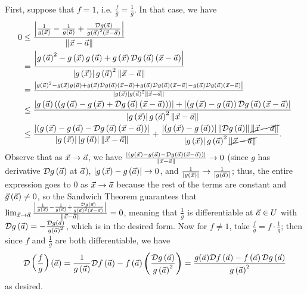 \documentclass[main.tex]{subfiles}
\begin{document}
\begin{soln}
    First, suppose that $f = 1$, i.e. $\frac{f}{g} = \frac{1}{g}$. In that case, we have
    \begin{align*}
        0&\le \frac{\abs{\frac{1}{g\parens{\vx}} - \frac{1}{g\parens{\va}} + \frac{\mathcal{D}g\parens{\va}}{g\parens{\va}^2\parens{\vx - \va}}}}{\norm{\vx - \va}} \\
        &=\frac{\abs{g\parens{\va}^2 - g\parens{\vx}g\parens{\va} + g\parens{\vx}\mathcal{D}g\parens{\va}\parens{\vx - \va}}}{\abs{g\parens{\vx}}g\parens{\va}^2\norm{\vx - \va}} \\
        &=\tfrac{\abs{g\parens{\va}^2 - g\parens{\vx}g\parens{\va} + g\parens{\vx}\mathcal{D}g\parens{\va}\parens{\vx - \va} + g\parens{\va}\mathcal{D}g\parens{\va}\parens{\vx - \va} - g\parens{\va}\mathcal{D}g\parens{\va}\parens{\vx - \va}}}{\abs{g\parens{\vx}}g\parens{\va}^2\norm{\vx - \va}} \\
        &\le\frac{\abs{g\parens{\va}\parens{\parens{g\parens{\va} - g\parens{\vx} + \mathcal{D}g\parens{\va}\parens{\vx - \va}}}} + \abs{\parens{g\parens{\vx} - g\parens{\va}}\mathcal{D}g\parens{\va}\parens{\vx - \va}}}{\abs{g\parens{\vx}}g\parens{\va}^2\norm{\vx - \va}} \\
        &\le \frac{\abs{\parens{g\parens{\vx} - g\parens{\va} - \mathcal{D}g\parens{\va}\parens{\vx - \va}}}}{\abs{g\parens{\vx}}\abs{g\parens{\va}}\norm{\vx - \va}} + \frac{\abs{\parens{g\parens{\vx} - g\parens{\va}}}\norm{\mathcal{D}g\parens{\va}}\cancel{\norm{\vx - \va}}}{\abs{g\parens{\vx}}g\parens{\va}^2\cancel{\norm{\vx - \va}}}.
    \end{align*}
    Observe that as $\vx\to\va$, we have $\frac{\abs{\parens{g\parens{\vx} - g\parens{\va} - \mathcal{D}g\parens{\va}\parens{\vx - \va}}}}{\norm{\vx - \va}}\to 0$ (since $g$ has derivative $\mathcal{D}g\parens{\va}$ at $\va$), $\abs{g\parens{\vx} - g\parens{\va}} \to 0$, and $\frac{1}{\abs{g\parens{\vx}}}\to \frac{1}{\abs{g\parens{\va}}}$; thus, the entire expression goes to $0$ as $\vx\to \va$ because the rest of the terms are constant and $\vg\parens{\va} \neq 0$, so the Sandwich Theorem guarantees that $\limv{a} \frac{\abs{\frac{1}{g\parens{\vx}} - \frac{1}{g\parens{\va}} + \frac{\mathcal{D}g\parens{\va}}{g\parens{\va}^2\parens{\vx - \va}}}}{\norm{\vx - \va}} = 0$, meaning that $\frac{1}{g}$ is differentiable at $\va\in U$ with $\mathcal{D}g\parens{\va} = -\frac{\mathcal{D}g\parens{\va}}{g\parens{\va}^2}$, which is in the desired form. Now for $f\neq 1$, take $\frac{f}{g} = f\cdot \frac{1}{g}$; then since $f$ and $\frac{1}{g}$ are both differentiable, we have
    \[\mathcal{D}\parens{\frac{f}{g}}\parens{\va} = \frac{1}{g\parens{\va}}\mathcal{D}f\parens{\va} - f\parens{\va}\parens{\frac{\mathcal{D}g\parens{\va}}{g\parens{\va}^2}} = \frac{g(\va)\mathcal{D}f\parens{\va} -f\parens{\va}\mathcal{D}g\parens{\va}}{g\parens{\va}^{2}}\]
    as desired.
\end{soln}
\eject
\end{document}
